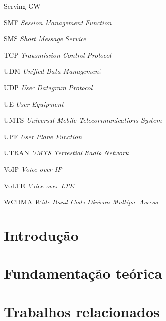 \documentclass[ecp,tc]{iiufrgs}
\begin{document}
\begin{listofabbrv}{Serving GW}
    \item[SMF]      \textit{Session Management Function}
    \item[SMS]      \textit{Short Message Service}
    \item[TCP]      \textit{Transmission Control Protocol}
    \item[UDM]      \textit{Unified Data Management}
    \item[UDP]      \textit{User Datagram Protocol}
    \item[UE]       \textit{User Equipment}
    \item[UMTS]     \textit{Universal Mobile Telecommunications System}
    \item[UPF]      \textit{User Plane Function}
    \item[UTRAN]    \textit{UMTS Terrestial Radio Network}
    \item[VoIP]     \textit{Voice over IP}
    \item[VoLTE]    \textit{Voice over LTE}
    \item[WCDMA]    \textit{Wide-Band Code-Divison Multiple Access}
\end{listofabbrv}


\listoffigures

\listoftables

\tableofcontents


\chapter{Introdução}
\label{chap:intro}


\chapter{Fundamentação teórica}
\label{chap:background}


\chapter{Trabalhos relacionados}
\label{chap:related}

\end{document}
